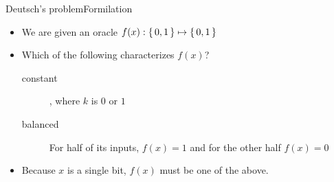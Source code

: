 
\begin{frame}{Deutsch's problem}{Formilation}

\begin{itemize}
    \item We are given an oracle $f(x): \left\{\,0,1\,\right\} \mapsto \left\{\,0,1\,\right\}$
    \item Which of the following characterizes $f(x)$?
    \begin{description}
        \item[constant]   , where $k$ is $0$ or $1$
        \item[balanced]   For half of its inputs, $f(x)=1$ and for the other half $f(x)=0$
    \end{description}
    \item Because $x$ is a single bit, $f(x)$ must be one of the above.
\end{itemize}
    
\end{frame}
